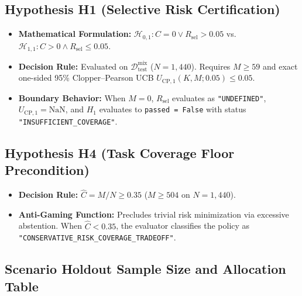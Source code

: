 \documentclass[10pt,a4paper]{article}
\begin{document}
\subsection{Hypothesis H1 (Selective Risk Certification)}
\begin{itemize}
    \item \textbf{Mathematical Formulation:} $\mathcal{H}_{0,1}: C = 0 \lor R_{\mathrm{sel}} > 0.05$ vs. $\mathcal{H}_{1,1}: C > 0 \land R_{\mathrm{sel}} \le 0.05$.
    \item \textbf{Decision Rule:} Evaluated on $\mathcal{D}_{\text{test}}^{\text{mix}}$ ($N=1,440$). Requires $M \ge 59$ and exact one-sided 95\% Clopper--Pearson UCB $U_{\mathrm{CP}, 1}(K, M; 0.05) \le 0.05$.
    \item \textbf{Boundary Behavior:} When $M=0$, $R_{\mathrm{sel}}$ evaluates as \texttt{"UNDEFINED"}, $U_{\mathrm{CP}, 1} = \mathrm{NaN}$, and $H_1$ evaluates to \texttt{passed = False} with status \texttt{"INSUFFICIENT\_COVERAGE"}.
\end{itemize}

\subsection{Hypothesis H4 (Task Coverage Floor Precondition)}
\begin{itemize}
    \item \textbf{Decision Rule:} $\hat{C} = M / N \ge 0.35$ ($M \ge 504$ on $N = 1,440$).
    \item \textbf{Anti-Gaming Function:} Precludes trivial risk minimization via excessive abstention. When $\hat{C} < 0.35$, the evaluator classifies the policy as \texttt{"CONSERVATIVE\_RISK\_COVERAGE\_TRADEOFF"}.
\end{itemize}

\subsection{Scenario Holdout Sample Size and Allocation Table}
\end{document}
